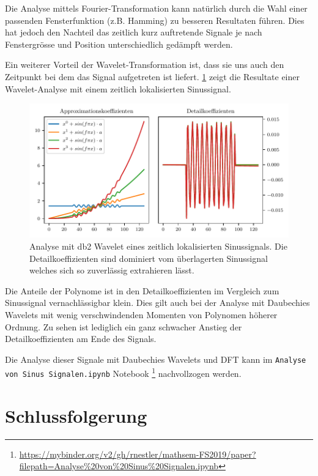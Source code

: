 \begin{refsection}
Die Analyse mittels Fourier-Transformation kann natürlich durch die Wahl einer
passenden Fensterfunktion (z.B. Hamming) zu besseren Resultaten führen. Dies
hat jedoch den Nachteil das zeitlich kurz auftretende Signale je nach
Fenstergrösse und Position unterschiedlich gedämpft werden.

Ein weiterer Vorteil der Wavelet-Transformation ist, dass sie uns auch den
Zeitpunkt bei dem das Signal aufgetreten ist liefert.
\cref{polynomials:sin:padded} zeigt die Resultate einer Wavelet-Analyse mit
einem zeitlich lokalisierten Sinussignal.
\begin{figure}
    \centering
    \includegraphics{papers/polynomials/images/polynomials_sin_padded_db2.pdf}
    \caption{Analyse mit db2 Wavelet eines zeitlich lokalisierten
             Sinussignals. Die Detailkoeffizienten sind dominiert vom
             überlagerten Sinussignal welches sich so zuverlässig extrahieren
             lässt.\label{polynomials:sin:padded}}
\end{figure}
Die Anteile der Polynome ist in den Detailkoeffizienten im Vergleich zum
Sinussignal vernachlässigbar klein. Dies gilt auch bei der Analyse mit
Daubechies Wavelets mit wenig verschwindenden Momenten von Polynomen höherer
Ordnung. Zu sehen ist lediglich ein ganz schwacher Anstieg der
Detailkoeffizienten am Ende des Signals.

Die Analyse dieser Signale mit Daubechies Wavelets und DFT kann im
\texttt{Analyse von Sinus Signalen.ipynb} Notebook%
\footnote{\url{https://mybinder.org/v2/gh/rnestler/mathsem-FS2019/paper?filepath=Analyse\%20von\%20Sinus\%20Signalen.ipynb}}
nachvollzogen werden.

\section{Schlussfolgerung}

\printbibliography[heading=subbibliography]
\end{refsection}
